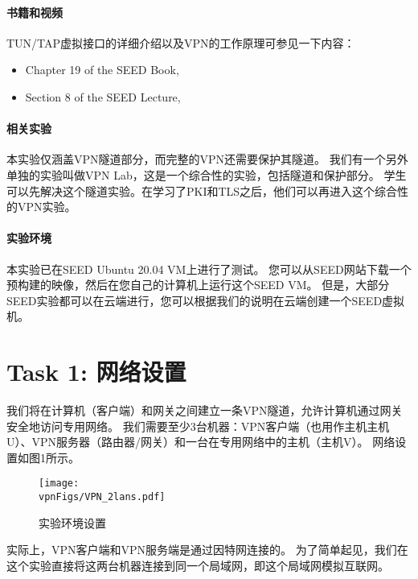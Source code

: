 \paragraph{书籍和视频}
TUN/TAP虚拟接口的详细介绍以及VPN的工作原理可参见一下内容：

\begin{itemize}[noitemsep]
\item Chapter 19 of the SEED Book, \seedbook
\item Section 8 of the SEED Lecture, \seedisvideo
\end{itemize}


\paragraph{相关实验}
本实验仅涵盖VPN隧道部分，而完整的VPN还需要保护其隧道。
我们有一个另外单独的实验叫做VPN Lab，这是一个综合性的实验，包括隧道和保护部分。
学生可以先解决这个隧道实验。在学习了PKI和TLS之后，他们可以再进入这个综合性的VPN实验。


\paragraph{实验环境}
本实验已在SEED Ubuntu 20.04 VM上进行了测试。
您可以从SEED网站下载一个预构建的映像，然后在您自己的计算机上运行这个SEED VM。
但是，大部分SEED实验都可以在云端进行，您可以根据我们的说明在云端创建一个SEED虚拟机。


\section{Task 1: 网络设置}

我们将在计算机（客户端）和网关之间建立一条VPN隧道，允许计算机通过网关安全地访问专用网络。
我们需要至少3台机器：VPN客户端（也用作主机主机U）、VPN服务器（路由器/网关）和一台在专用网络中的主机（主机V）。
网络设置如图1所示。


\begin{figure}[htb]
  \begin{center}
    \texttt{[image: \\vpnFigs/VPN\_2lans.pdf]}
  \end{center}
  \caption{实验环境设置}
  \label{vpn:fig:labenv}
\end{figure}


实际上，VPN客户端和VPN服务端是通过因特网连接的。
为了简单起见，我们在这个实验直接将这两台机器连接到同一个局域网，即这个局域网模拟互联网。


